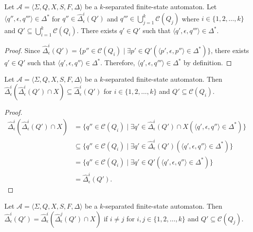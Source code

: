 \begin{proposition}
  Let $\mathcal{A} = \langle \Sigma, Q, X, S, F, \Delta \rangle$ be a $k$-separated
  finite-state automaton. Let $\langle q'', \epsilon, q''' \rangle \in \Delta^*$ for
  $q'' \in \hat{\Delta}_\epsilon^i(Q')$ and $q''' \in \bigcup_{j=1}^k
  \mathcal{C}(Q_j)$ where $i \in \{ 1, 2, \ldots, k \}$ and $Q' \subseteq
  \bigcup_{i=1}^k \mathcal{C}(Q_i)$. There exists $q' \in Q'$ such that $\langle q',
  \epsilon, q''' \rangle \in \Delta^*$.
\end{proposition}

\begin{proof}
  Since $\hat{\Delta}_\epsilon^i(Q') = \{ p'' \in \mathcal{C}(Q_i) \mid \exists p'
  \in Q' (\langle p', \epsilon, p'' \rangle \in \Delta^*) \}$, there exists $q' \in
  Q'$ such that $\langle q', \epsilon, q'' \rangle \in \Delta^*$. Therefore, $\langle
  q', \epsilon, q''' \rangle \in \Delta^*$ by definition.
\end{proof}

\begin{proposition}
  Let $\mathcal{A} = \langle \Sigma, Q, X, S, F, \Delta \rangle$ be a $k$-separated
  finite-state automaton. Then $\hat{\Delta}_\epsilon^i(\hat{\Delta}_\epsilon^i(Q')
  \cap X) \subseteq \hat{\Delta}_\epsilon^i(Q')$ for $i \in \{ 1, 2, \ldots, k \}$
  and $Q' \subseteq \mathcal{C}(Q_i)$.
\end{proposition}

\begin{proof}
  \begin{align*}
    \hat{\Delta}_\epsilon^i(\hat{\Delta}_\epsilon^i(Q') \cap X)
    &= \{ q'' \in \mathcal{C}(Q_i) \mid \exists q' \in \hat{\Delta}_\epsilon^i(Q')
    \cap X (\langle q', \epsilon, q'' \rangle \in \Delta^*) \}\\
    &\subseteq \{ q'' \in \mathcal{C}(Q_i) \mid \exists q' \in
    \hat{\Delta}_\epsilon^i(Q') (\langle q', \epsilon, q'' \rangle \in \Delta^*) \}\\
    &= \{ q'' \in \mathcal{C}(Q_i) \mid \exists q' \in Q' (\langle q', \epsilon, q''
    \rangle \in \Delta^*) \}\\
    & = \hat{\Delta}_\epsilon^i(Q').
  \end{align*}
\end{proof}

\begin{proposition}
  Let $\mathcal{A} = \langle \Sigma, Q, X, S, F, \Delta \rangle$ be a $k$-separated
  finite-state automaton. Then $\hat{\Delta}_\epsilon^i(Q') =
  \hat{\Delta}_\epsilon^i(\hat{\Delta}_\epsilon^j(Q') \cap X)$ if $i \neq j$ for $i,
  j \in \{ 1, 2, \ldots, k \}$ and $Q' \subseteq \mathcal{C}(Q_j)$.
\end{proposition}

